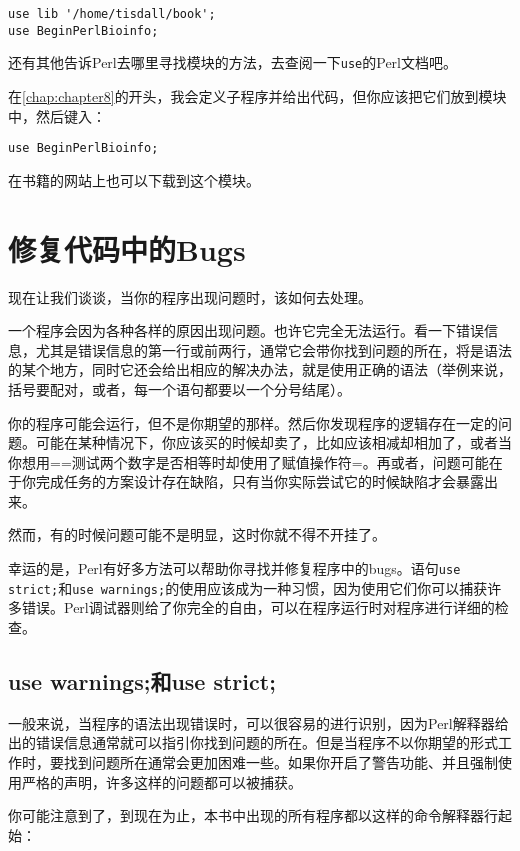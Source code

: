 \begin{lstlisting}
use lib '/home/tisdall/book';
use BeginPerlBioinfo;
\end{lstlisting}

还有其他告诉Perl去哪里寻找模块的方法，去查阅一下\verb|use|的Perl文档吧。

在\autoref{chap:chapter8}的开头，我会定义子程序并给出代码，但你应该把它们放到模块中，然后键入：

\begin{lstlisting}
use BeginPerlBioinfo;
\end{lstlisting}

在书籍的网站上也可以下载到这个模块。

\section{修复代码中的Bugs}
现在让我们谈谈，当你的程序出现问题时，该如何去处理。

一个程序会因为各种各样的原因出现问题。也许它完全无法运行。看一下错误信息，尤其是错误信息的第一行或前两行，通常它会带你找到问题的所在，将是语法的某个地方，同时它还会给出相应的解决办法，就是使用正确的语法（举例来说，括号要配对，或者，每一个语句都要以一个分号结尾）。

你的程序可能会运行，但不是你期望的那样。然后你发现程序的逻辑存在一定的问题。可能在某种情况下，你应该买的时候却卖了，比如应该相减却相加了，或者当你想用==测试两个数字是否相等时却使用了赋值操作符=。再或者，问题可能在于你完成任务的方案设计存在缺陷，只有当你实际尝试它的时候缺陷才会暴露出来。

然而，有的时候问题可能不是明显，这时你就不得不开挂了。

幸运的是，Perl有好多方法可以帮助你寻找并修复程序中的bugs。语句\verb|use strict;|和\verb|use warnings;|的使用应该成为一种习惯，因为使用它们你可以捕获许多错误。Perl调试器则给了你完全的自由，可以在程序运行时对程序进行详细的检查。

\subsection{use warnings;和use strict;}
一般来说，当程序的语法出现错误时，可以很容易的进行识别，因为Perl解释器给出的错误信息通常就可以指引你找到问题的所在。但是当程序不以你期望的形式工作时，要找到问题所在通常会更加困难一些。如果你开启了警告功能、并且强制使用严格的声明，许多这样的问题都可以被捕获。

你可能注意到了，到现在为止，本书中出现的所有程序都以这样的命令解释器行起始：

